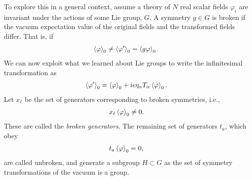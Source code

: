 To explore this in a general context, assume a theory of $N$ real scalar fields $\varphi_i$ are invariant under the actions of some Lie group, $G$.
A symmetry $g \in G$ is broken if the vacuum expectation value of the original fields and the transformed fields differ.
That is, if
%
\begin{equation}
    \left\langle \varphi \right\rangle_0 \neq \left\langle \varphi' \right\rangle_0 = \left\langle g \varphi \right\rangle_0.
\end{equation}
%
We can now exploit what we learned about Lie groups to write the infinitesimal transformation as
%
\begin{equation}
    \left\langle \varphi' \right\rangle_0 = \left\langle \varphi \right\rangle_0 + i \epsilon \eta_\alpha T_\alpha \left\langle \varphi \right\rangle_0.
\end{equation}
%
Let $x_\ell$ be the set of generators corresponding to broken symmetries, i.e.,
%
\begin{equation}
    x_\ell \left\langle \varphi \right\rangle_0 \neq 0.
\end{equation}
%
These are called the \emph{broken generators}.
The remaining set of generators $t_a$, which obey
%
\begin{equation}
    t_a \left\langle \varphi \right\rangle_0 = 0,
\end{equation}
%
are called unbroken, and generate a subgroup $H \subset G$ as the set of symmetry transformations of the vacuum is a group.

